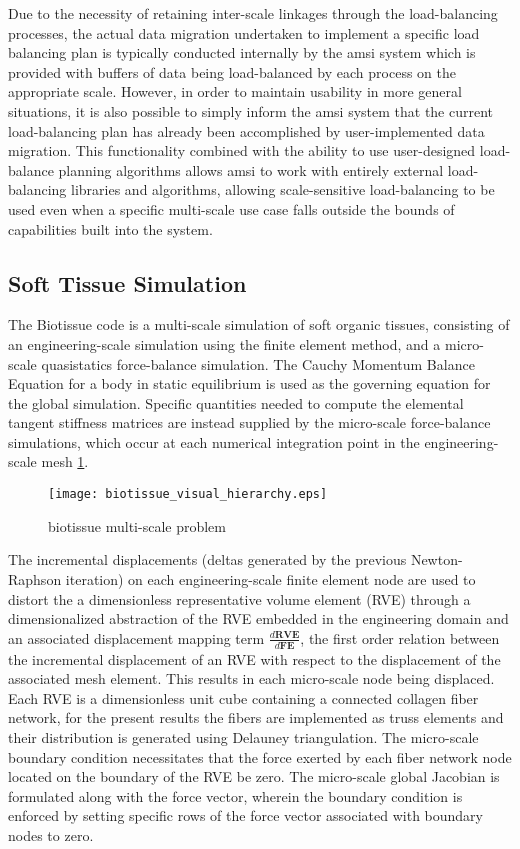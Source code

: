 \documentclass[11pt]{siamltex1213}
\begin{document}
Due to the necessity of retaining inter-scale linkages through the load-balancing processes, the actual data migration undertaken to implement a specific load balancing plan is typically conducted internally by the amsi system which is provided with buffers of data being load-balanced by each process on the appropriate scale. However, in order to maintain usability in more general situations, it is also possible to simply inform the amsi system that the current load-balancing plan has already been accomplished by user-implemented data migration. This functionality combined with the ability to use user-designed load-balance planning algorithms allows amsi to work with entirely external load-balancing libraries and algorithms, allowing scale-sensitive load-balancing to be used even when a specific multi-scale use case falls outside the bounds of capabilities built into the system.

\subsection{Soft Tissue Simulation}\label{biotissue}
The Biotissue code is a multi-scale simulation of soft organic tissues, consisting of an engineering-scale simulation using the finite element method, and a micro-scale quasistatics force-balance simulation. The Cauchy Momentum Balance Equation for a body in static equilibrium is used as the governing equation for the global simulation. Specific quantities needed to compute the elemental tangent stiffness matrices are instead supplied by the micro-scale force-balance simulations, which occur at each numerical integration point in the engineering-scale mesh \ref{biotissue_hierarchy}. 

\begin{figure}
  \begin{center}
    \texttt{[image: biotissue\_visual\_hierarchy.eps]}
  \end{center}
  \caption{\small biotissue multi-scale problem}
  \label{biotissue_hierarchy}
\end{figure}

The incremental displacements (deltas generated by the previous Newton-Raphson iteration) on each engineering-scale finite element node are used to distort the a dimensionless representative volume element (RVE) through a dimensionalized abstraction of the RVE embedded in the engineering domain and an associated displacement mapping term $\frac{d\mathbf{RVE}}{d\mathbf{FE}}$, the first order relation between the incremental displacement of an RVE with respect to the displacement of the associated mesh element. This results in each micro-scale node being displaced. Each RVE is a dimensionless unit cube containing a connected collagen fiber network, for the present results the fibers are implemented as truss elements and their distribution is generated using Delauney triangulation. The micro-scale boundary condition necessitates that the force exerted by each fiber network node located on the boundary of the RVE be zero. The micro-scale global Jacobian is formulated along with the force vector, wherein the boundary condition is enforced by setting specific rows of the force vector associated with boundary nodes to zero. 
\end{document}
